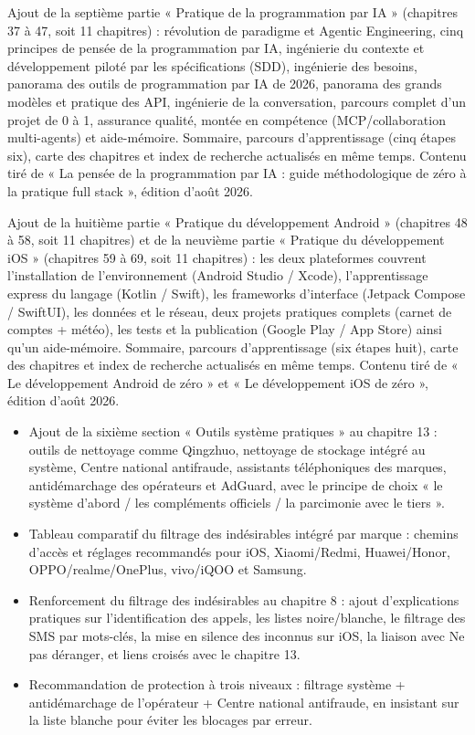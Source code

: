 
Ajout de la septième partie « Pratique de la programmation par IA » (chapitres 37 à 47, soit 11 chapitres) : révolution de paradigme et Agentic Engineering, cinq principes de pensée de la programmation par IA, ingénierie du contexte et développement piloté par les spécifications (SDD), ingénierie des besoins, panorama des outils de programmation par IA de 2026, panorama des grands modèles et pratique des API, ingénierie de la conversation, parcours complet d'un projet de 0 à 1, assurance qualité, montée en compétence (MCP/collaboration multi-agents) et aide-mémoire. Sommaire, parcours d'apprentissage (cinq étapes six), carte des chapitres et index de recherche actualisés en même temps. Contenu tiré de « La pensée de la programmation par IA : guide méthodologique de zéro à la pratique full stack », édition d'août 2026.

Ajout de la huitième partie « Pratique du développement Android » (chapitres 48 à 58, soit 11 chapitres) et de la neuvième partie « Pratique du développement iOS » (chapitres 59 à 69, soit 11 chapitres) : les deux plateformes couvrent l'installation de l'environnement (Android Studio / Xcode), l'apprentissage express du langage (Kotlin / Swift), les frameworks d'interface (Jetpack Compose / SwiftUI), les données et le réseau, deux projets pratiques complets (carnet de comptes + météo), les tests et la publication (Google Play / App Store) ainsi qu'un aide-mémoire. Sommaire, parcours d'apprentissage (six étapes huit), carte des chapitres et index de recherche actualisés en même temps. Contenu tiré de « Le développement Android de zéro » et « Le développement iOS de zéro », édition d'août 2026.


\begin{itemize}
  \item Ajout de la sixième section « Outils système pratiques » au chapitre 13 : outils de nettoyage comme Qingzhuo, nettoyage de stockage intégré au système, Centre national antifraude, assistants téléphoniques des marques, antidémarchage des opérateurs et AdGuard, avec le principe de choix « le système d'abord / les compléments officiels / la parcimonie avec le tiers ».
  \item Tableau comparatif du filtrage des indésirables intégré par marque : chemins d'accès et réglages recommandés pour iOS, Xiaomi/Redmi, Huawei/Honor, OPPO/realme/OnePlus, vivo/iQOO et Samsung.
  \item Renforcement du filtrage des indésirables au chapitre 8 : ajout d'explications pratiques sur l'identification des appels, les listes noire/blanche, le filtrage des SMS par mots-clés, la mise en silence des inconnus sur iOS, la liaison avec Ne pas déranger, et liens croisés avec le chapitre 13.
  \item Recommandation de protection à trois niveaux : filtrage système + antidémarchage de l'opérateur + Centre national antifraude, en insistant sur la liste blanche pour éviter les blocages par erreur.
\end{itemize}

